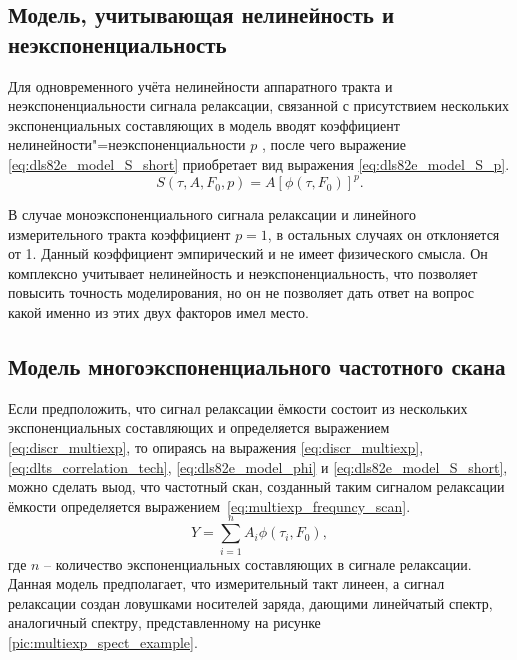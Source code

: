     \subsection{Модель, учитывающая нелинейность и неэкспоненциальность}

    Для одновременного учёта нелинейности аппаратного тракта и 
    неэкспоненциальности сигнала релаксации, связанной с присутствием 
    нескольких экспоненциальных составляющих в модель вводят коэффициент
    нелинейности"=неэкспоненциальности $p$ \cite{rp_vak}, после чего 
    выражение \ref{eq:dls82e_model_S_short} приобретает вид выражения 
    \ref{eq:dls82e_model_S_p}.
    \begin{equation}
        \label{eq:dls82e_model_S_p}
        S(\tau,A,F_0,p) = A\left[\phi(\tau, F_0)\right]^p.
    \end{equation}

    В случае моноэкспоненциального сигнала релаксации и линейного измерительного
    тракта коэффициент $p=1$, в остальных случаях он отклоняется от 1. Данный 
    коэффициент эмпирический и не имеет физического смысла. Он комплексно 
    учитывает нелинейность и неэкспоненциальность, что позволяет повысить 
    точность моделирования, но он не позволяет дать ответ на вопрос какой 
    именно из этих двух факторов имел место.


    \subsection{Модель многоэкспоненциального частотного скана}
    Если предположить, что сигнал релаксации ёмкости состоит из нескольких
    экспоненциальных составляющих и определяется выражением
    \ref{eq:discr_multiexp}, то опираясь на выражения
    \ref{eq:discr_multiexp}, \ref{eq:dlts_correlation_tech},
    \ref{eq:dls82e_model_phi} и \ref{eq:dls82e_model_S_short}, можно
    сделать выод, что частотный скан, созданный таким сигналом релаксации
    ёмкости определяется выражением~\ref{eq:multiexp_frequncy_scan}.
    \begin{equation}
        \label{eq:multiexp_frequncy_scan}
        Y = \sum_{i=1}^{n} A_i \phi(\tau_i, F_0) ,
    \end{equation}
    где $n$ -- количество экспоненциальных составляющих в сигнале 
    релаксации.
    Данная модель предполагает, что измерительный такт линеен, а сигнал
    релаксации создан ловушками носителей заряда, дающими линейчатый спектр,
    аналогичный спектру, представленному на рисунке 
    \ref{pic:multiexp_spect_example}.